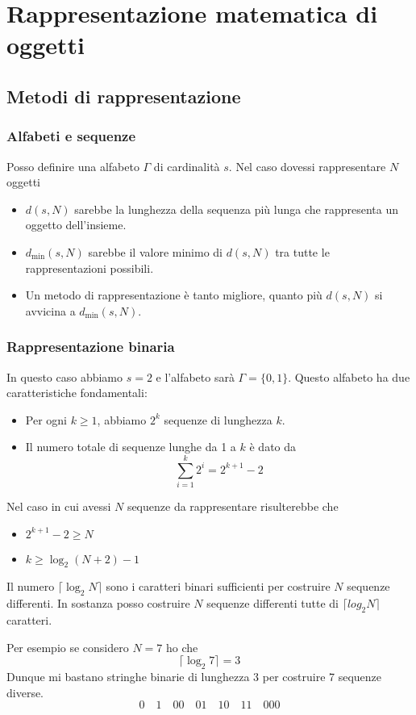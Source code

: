 \chapter{Rappresentazione matematica di oggetti}
\section{Metodi di rappresentazione}
\subsection{Alfabeti e sequenze}
Posso definire una alfabeto $\Gamma$ di cardinalit\`a $s$. Nel caso dovessi
rappresentare $N$ oggetti
\begin{itemize}
	\item $d(s, N)$ sarebbe la lunghezza della sequenza pi\`u lunga che rappresenta un
	      oggetto dell'insieme.
	\item $d_{\min}(s, N)$ sarebbe il valore minimo di $d(s, N)$ tra tutte le
	      rappresentazioni possibili.
	\item Un metodo di rappresentazione \`e tanto migliore, quanto pi\`u
	      $d(s, N)$ si avvicina a $d_{\min}(s, N)$.
\end{itemize}

\subsection{Rappresentazione binaria}
In questo caso abbiamo $s = 2$ e l'alfabeto sar\`a $\Gamma = \{ 0, 1 \}$. Questo
alfabeto ha due caratteristiche fondamentali:
\begin{itemize}
	\item Per ogni $k \geq 1$, abbiamo $2^k$ sequenze di lunghezza $k$.
	\item Il numero totale di sequenze lunghe da 1 a $k$ \`e dato da
	      \[
		      \sum_{i = 1}^k 2^i = 2^{k + 1} - 2
	      \]
\end{itemize}
Nel caso in cui avessi $N$ sequenze da rappresentare risulterebbe che
\begin{itemize}
	\item $2^{k + 1} - 2 \geq N$
	\item $k \geq \log_2 (N + 2) - 1$
\end{itemize}
Il numero $\lceil \log_2 N \rceil$ sono i caratteri binari sufficienti per costruire $N$
sequenze differenti. In sostanza posso costruire $N$ sequenze differenti tutte di
$\lceil log_2 N \rceil$ caratteri.

Per esempio se considero $N = 7$ ho che \[ \lceil \log_2 7 \rceil = 3 \] Dunque mi bastano
stringhe binarie di lunghezza 3 per costruire 7 sequenze diverse.
\[ 0 \quad 1 \quad 00 \quad 01 \quad 10 \quad 11 \quad 000 \]

